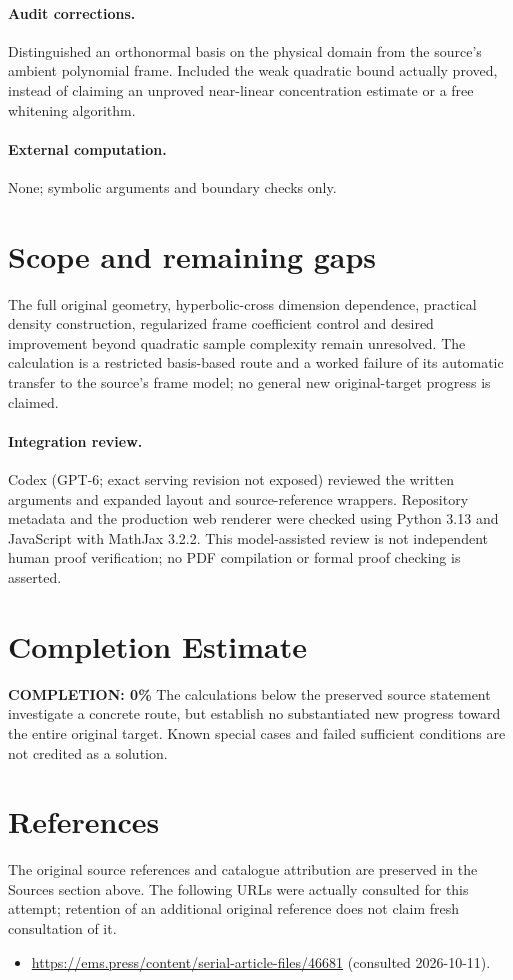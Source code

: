 \documentclass[11pt]{article}
\begin{document}
\paragraph{Audit corrections.} Distinguished an orthonormal basis on the physical domain from the source's ambient polynomial frame. Included the weak quadratic bound actually proved, instead of claiming an unproved near-linear concentration estimate or a free whitening algorithm.
\paragraph{External computation.} None; symbolic arguments and boundary checks only.
\section{Scope and remaining gaps}
The full original geometry, hyperbolic-cross dimension dependence, practical density construction, regularized frame coefficient control and desired improvement beyond quadratic sample complexity remain unresolved. The calculation is a restricted basis-based route and a worked failure of its automatic transfer to the source's frame model; no general new original-target progress is claimed.
\paragraph{Integration review.} Codex (GPT-6; exact serving revision not exposed) reviewed the written arguments and expanded layout and source-reference wrappers. Repository metadata and the production web renderer were checked using Python 3.13 and JavaScript with MathJax 3.2.2. This model-assisted review is not independent human proof verification; no PDF compilation or formal proof checking is asserted.

\section{Completion Estimate}
\noindent\textbf{COMPLETION: 0\%}
The calculations below the preserved source statement investigate a concrete route,
but establish no substantiated new progress toward the entire original target.
Known special cases and failed sufficient conditions are not credited as a solution.
\section{References}
The original source references and catalogue attribution are preserved in the
Sources section above. The following URLs were actually consulted for this attempt;
retention of an additional original reference does not claim fresh consultation of it.
\begin{itemize}
\item \url{https://ems.press/content/serial-article-files/46681} (consulted 2026-10-11). 
\end{itemize}
\end{document}
